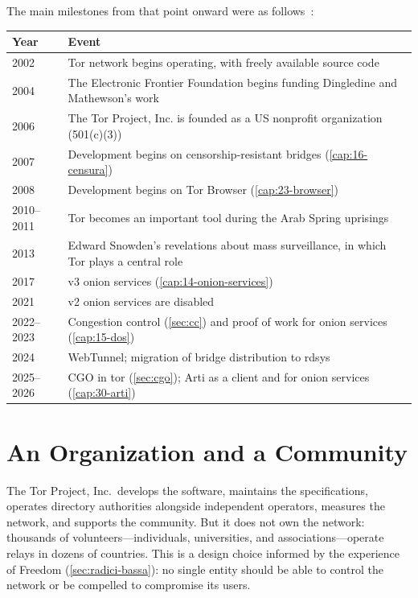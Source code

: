 The main milestones from that point onward were as follows~\cite{torhistory}:
\begin{center}\small
\begin{tabularx}{\textwidth}{@{}l>{\raggedright\arraybackslash}X@{}}
\toprule
Year & Event \\
\midrule
2002 & Tor network begins operating, with freely available source code \\
2004 & The Electronic Frontier Foundation begins funding Dingledine and Mathewson's work \\
2006 & The Tor Project, Inc. is founded as a US nonprofit organization (501(c)(3)) \\
2007 & Development begins on censorship-resistant bridges (\cref{cap:16-censura}) \\
2008 & Development begins on Tor Browser (\cref{cap:23-browser}) \\
2010--2011 & Tor becomes an important tool during the Arab Spring uprisings \\
2013 & Edward Snowden's revelations about mass surveillance, in which Tor plays a central role \\
2017 & v3 onion services (\cref{cap:14-onion-services}) \\
2021 & v2 onion services are disabled \\
2022--2023 & Congestion control (\cref{sec:cc}) and proof of work for onion services (\cref{cap:15-dos}) \\
2024 & WebTunnel; migration of bridge distribution to rdsys \\
2025--2026 & CGO in tor (\cref{sec:cgo}); Arti as a client and for onion services (\cref{cap:30-arti}) \\
\bottomrule
\end{tabularx}
\end{center}

\section{An Organization and a Community}\label{sec:nascita-comunita}

The Tor Project, Inc.\ develops the software, maintains the specifications, operates directory authorities alongside independent operators, measures the network, and supports the community. But it does not own the network: thousands of volunteers---individuals, universities, and associations---operate relays in dozens of countries. This is a design choice informed by the experience of Freedom (\cref{sec:radici-bassa}): no single entity should be able to control the network or be compelled to compromise its users.

